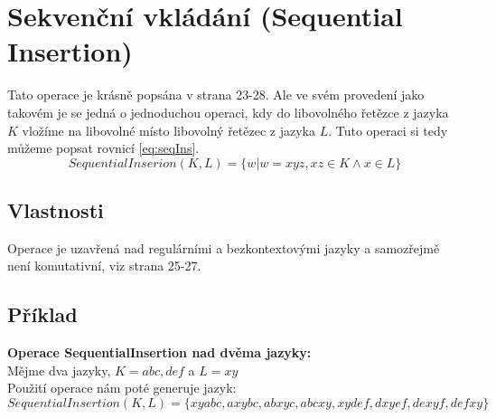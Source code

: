 \section{Sekvenční vkládání (Sequential Insertion)}\label{sec:seqIns}
Tato operace je krásně popsána v \cite{lilaKari} strana 23-28. Ale ve svém provedení jako takovém je se jedná o jednoduchou operaci, kdy do libovolného řetězce z jazyka $K$ vložíme na libovolné místo libovolný řetězec z jazyka $L$.
Tuto operaci si tedy můžeme popsat rovnicí \ref{eq:seqIns}.
\begin{equation}\label{eq:seqIns}
	SequentialInserion(K,L) = \{w|w=xyz, xz \in K \land x \in L\}
\end{equation}

\subsection{Vlastnosti}
Operace je uzavřená nad regulárními a bezkontextovými jazyky a samozřejmě není komutativní, viz \cite{lilaKari} strana 25-27.
\subsection{Příklad}
\textbf{Operace SequentialInsertion nad dvěma jazyky:}\\
Mějme dva jazyky, $K={abc,def}$ a $L={xy}$\\
Použití operace nám poté generuje jazyk:\\ $SequentialInsertion(K,L) = \{xyabc,axybc,abxyc,abcxy,xydef,dxyef,dexyf,defxy\}$

